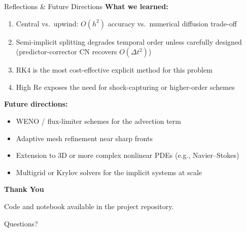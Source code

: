 \documentclass[aspectratio=169, 11pt]{beamer}
\begin{document}
\begin{frame}{Reflections \& Future Directions}
  \textbf{What we learned:}
  \begin{enumerate}
    \item Central vs.\ upwind: $O(h^2)$ accuracy vs.\ numerical diffusion trade-off
    \item Semi-implicit splitting degrades temporal order unless carefully designed (predictor-corrector CN recovers $O(\Delta t^2)$)
    \item RK4 is the most cost-effective explicit method for this problem
    \item High Re exposes the need for shock-capturing or higher-order schemes
  \end{enumerate}

  \bigskip
  \textbf{Future directions:}
  \begin{itemize}
    \item WENO / flux-limiter schemes for the advection term
    \item Adaptive mesh refinement near sharp fronts
    \item Extension to 3D or more complex nonlinear PDEs (e.g., Navier--Stokes)
    \item Multigrid or Krylov solvers for the implicit systems at scale
  \end{itemize}
\end{frame}

\begin{frame}
  \centering
  \vfill
  {\Large\bfseries Thank You}

  \bigskip
  Code and notebook available in the project repository.

  \bigskip
  {\small Questions?}
  \vfill
\end{frame}
\end{document}
